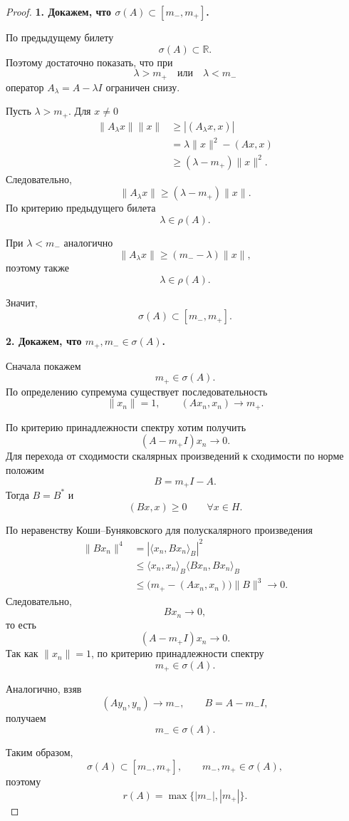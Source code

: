 \begin{proof}
	\textbf{1. Докажем, что \(\sigma(A)\subset[m_-,m_+]\).}
	
	По предыдущему билету
	\[
	\sigma(A)\subset\mathbb R.
	\]
	Поэтому достаточно показать, что при
	\[
	\lambda>m_+
	\quad\text{или}\quad
	\lambda<m_-
	\]
	оператор \(A_\lambda=A-\lambda I\) ограничен снизу.
	
	Пусть \(\lambda>m_+\). Для \(x\neq0\)
	\[
	\begin{aligned}
		\|A_\lambda x\|\|x\|
		&\geqslant
		|(A_\lambda x,x)|
		\\
		&=
		\lambda\|x\|^2-(Ax,x)
		\\
		&\geqslant
		(\lambda-m_+)\|x\|^2.
	\end{aligned}
	\]
	Следовательно,
	\[
	\|A_\lambda x\|
	\geqslant
	(\lambda-m_+)\|x\|.
	\]
	По критерию предыдущего билета
	\[
	\lambda\in\rho(A).
	\]
	
	При \(\lambda<m_-\) аналогично
	\[
	\|A_\lambda x\|
	\geqslant
	(m_--\lambda)\|x\|,
	\]
	поэтому также
	\[
	\lambda\in\rho(A).
	\]
	
	Значит,
	\[
	\boxed{\sigma(A)\subset[m_-,m_+]}.
	\]
	
	\textbf{2. Докажем, что \(m_+,m_-\in\sigma(A)\).}
	
	Сначала покажем
	\[
	m_+\in\sigma(A).
	\]
	По определению супремума существует последовательность
	\[
	\|x_n\|=1,
	\qquad
	(Ax_n,x_n)\to m_+.
	\]
	
	По критерию принадлежности спектру хотим получить
	\[
	(A-m_+I)x_n\to0.
	\]
	Для перехода от сходимости скалярных произведений к сходимости по норме положим
	\[
	B=m_+I-A.
	\]
	Тогда \(B=B^*\) и
	\[
	(Bx,x)\geqslant0
	\qquad
	\forall x\in H.
	\]
	
	По неравенству Коши--Буняковского для полускалярного произведения
	\[
	\begin{aligned}
		\|Bx_n\|^4
		&=
		|\langle x_n,Bx_n\rangle_B|^2
		\\
		&\leqslant
		\langle x_n,x_n\rangle_B
		\langle Bx_n,Bx_n\rangle_B
		\\
		&\leqslant
		\bigl(m_+-(Ax_n,x_n)\bigr)\|B\|^3
		\to0.
	\end{aligned}
	\]
	Следовательно,
	\[
	Bx_n\to0,
	\]
	то есть
	\[
	(A-m_+I)x_n\to0.
	\]
	Так как \(\|x_n\|=1\), по критерию принадлежности спектру
	\[
	m_+\in\sigma(A).
	\]
	
	Аналогично, взяв
	\[
	(Ay_n,y_n)\to m_-,
	\qquad
	B=A-m_-I,
	\]
	получаем
	\[
	m_-\in\sigma(A).
	\]
	
	Таким образом,
	\[
	\sigma(A)\subset[m_-,m_+],
	\qquad
	m_-,m_+\in\sigma(A),
	\]
	поэтому
	\[
	r(A)=\max\{|m_-|,|m_+|\}.
	\]
	

\end{proof}
